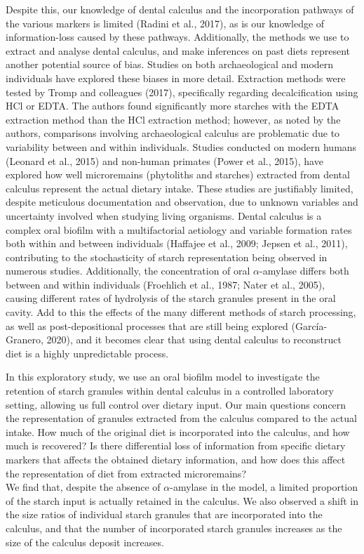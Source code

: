 \documentclass[
]{article}
\begin{document}
Despite this, our knowledge of dental calculus and the incorporation pathways of
the various markers is limited (Radini et al., 2017), as is our
knowledge of information-loss caused by these pathways. Additionally, the methods
we use to extract and analyse dental calculus, and make inferences on past diets
represent another potential source of bias. Studies on both archaeological and
modern individuals have explored these biases in more detail.
Extraction methods were tested
by Tromp and colleagues (2017), specifically regarding
decalcification using HCl or EDTA.
The authors found significantly more starches with the EDTA extraction method
than the HCl extraction method; however, as noted by the authors, comparisons
involving archaeological calculus are problematic due to variability between and
within individuals.
Studies conducted on modern humans (Leonard et al., 2015)
and non-human primates (Power et al., 2015),
have explored how well microremains (phytoliths and starches)
extracted from dental calculus represent the actual dietary intake.
These studies are justifiably limited,
despite meticulous documentation and observation, due to unknown variables and
uncertainty involved when studying living organisms. Dental calculus is a complex
oral biofilm with a multifactorial aetiology and variable formation rates both
within and between individuals (Haffajee et al., 2009; Jepsen et al., 2011),
contributing to
the stochasticity of starch representation being observed in numerous studies.
Additionally, the concentration of oral \(\alpha\)-amylase differs both between and
within individuals (Froehlich et al., 1987; Nater et al., 2005),
causing different rates of hydrolysis of the starch granules present in the oral
cavity. Add to this the effects of the many different methods
of starch processing, as well as post-depositional processes that are still being
explored (García-Granero, 2020), and it becomes clear that using
dental calculus to reconstruct diet is a highly unpredictable process.

In this exploratory study, we use an oral biofilm model to investigate the
retention of starch granules within dental calculus in a controlled laboratory
setting, allowing us full control over dietary input. Our main questions concern
the representation of granules extracted
from the calculus compared to the actual intake. How much of the original diet is
incorporated into the calculus, and how much is recovered?
Is there differential loss of information from specific dietary markers that affects
the obtained dietary information, and how does this affect the representation of
diet from extracted microremains?\\
We find that, despite the absence of \(\alpha\)-amylase in
the model, a limited proportion of the starch input is actually
retained in the calculus. We also observed a shift in the size ratios of individual
starch granules that are incorporated into the calculus, and that the number of
incorporated starch granules increases as the size of the calculus deposit
increases.
\end{document}
